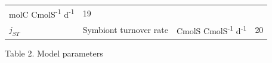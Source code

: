 \documentclass[]{elsarticle} %
\begin{document}
\begin{longtable}[c]{@{}llll@{}}
\begin{minipage}[t]{0.25\columnwidth}\raggedright\strut
molC CmolS\textsuperscript{-1} d\textsuperscript{-1}
\strut\end{minipage} &
\begin{minipage}[t]{0.10\columnwidth}\raggedright\strut
19
\strut\end{minipage}\tabularnewline
\begin{minipage}[t]{0.10\columnwidth}\raggedright\strut
\(j_{ST}\)
\strut\end{minipage} &
\begin{minipage}[t]{0.48\columnwidth}\raggedright\strut
Symbiont turnover rate
\strut\end{minipage} &
\begin{minipage}[t]{0.25\columnwidth}\raggedright\strut
CmolS CmolS\textsuperscript{-1} d\textsuperscript{-1}
\strut\end{minipage} &
\begin{minipage}[t]{0.10\columnwidth}\raggedright\strut
20
\strut\end{minipage}\tabularnewline
\bottomrule
\end{longtable}

Table 2. Model parameters
\end{document}
